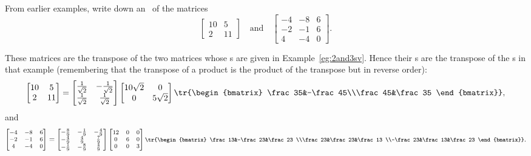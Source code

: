 \begin{example} \label{eg:}
From earlier examples, write down an \svd\ of the matrices
\begin{equation*}
\begin{bmatrix} 10&5\\2&11 \end{bmatrix}
\quad\text{and}\quad
\begin{bmatrix} -4&-8&6\\-2&-1&6\\4&-4&0 \end{bmatrix}.
\end{equation*}

\begin{solution} 
These matrices are the transpose of the two matrices whose \svd{}s are given in Example~\ref{eg:2and3sv}.
Hence their \svd{}s are the transpose of the \svd{}s in that example (remembering that the transpose of a product is the product of the transpose but in reverse order):
\begin{equation*}
\begin{bmatrix} 10&5\\2&11 \end{bmatrix}=
\begin{bmatrix} \frac1{\sqrt2}&-\frac1{\sqrt2}\\ \frac1{\sqrt2}&\frac1{\sqrt2} \end{bmatrix}
\begin{bmatrix} 10\sqrt2&0\\0&5\sqrt2 \end{bmatrix}
\tr{\begin{bmatrix} \frac35&-\frac45\\\frac45&\frac35 \end{bmatrix}},
\end{equation*}
and
\begin{equation*}\footnotesize
\begin{bmatrix} -4&-8&6\\-2&-1&6\\4&-4&0 \end{bmatrix}=
\begin{bmatrix} -\frac89&-\frac19&-\frac49
\\-\frac49&\frac49&\frac79
\\-\frac19&-\frac89&\frac49 \end{bmatrix}
\begin{bmatrix} 12&0&0\\0&6&0\\0&0&3 \end{bmatrix}
\tr{\begin{bmatrix} \frac13&-\frac23&\frac23
\\\frac23&\frac23&\frac13
\\-\frac23&\frac13&\frac23 \end{bmatrix}}.
\end{equation*}
\end{solution}
\end{example}





